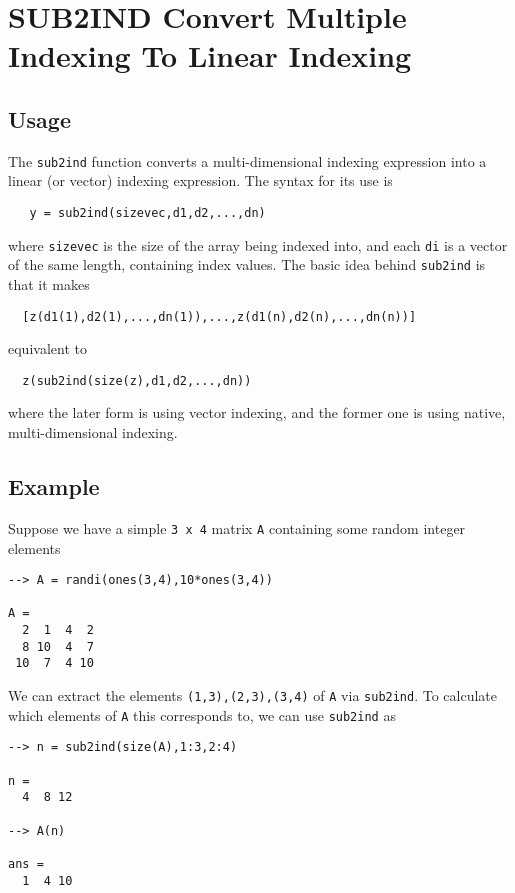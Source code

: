 \section{SUB2IND Convert Multiple Indexing To Linear Indexing}

\subsection{Usage}

The \verb|sub2ind| function converts a multi-dimensional indexing expression
into a linear (or vector) indexing expression.  The syntax for its use
is
\begin{verbatim}
   y = sub2ind(sizevec,d1,d2,...,dn)
\end{verbatim}
where \verb|sizevec| is the size of the array being indexed into, and each
\verb|di| is a vector of the same length, containing index values.  The basic
idea behind \verb|sub2ind| is that it makes
\begin{verbatim}
  [z(d1(1),d2(1),...,dn(1)),...,z(d1(n),d2(n),...,dn(n))]
\end{verbatim}
equivalent to
\begin{verbatim}
  z(sub2ind(size(z),d1,d2,...,dn))
\end{verbatim}
where the later form is using vector indexing, and the former one is using
native, multi-dimensional indexing.
\subsection{Example}

Suppose we have a simple \verb|3 x 4| matrix \verb|A| containing some random integer
elements
\begin{verbatim}
--> A = randi(ones(3,4),10*ones(3,4))

A = 
  2  1  4  2 
  8 10  4  7 
 10  7  4 10 
\end{verbatim}
We can extract the elements \verb|(1,3),(2,3),(3,4)| of \verb|A| via \verb|sub2ind|.
To calculate which elements of \verb|A| this corresponds to, we can use
\verb|sub2ind| as
\begin{verbatim}
--> n = sub2ind(size(A),1:3,2:4)

n = 
  4  8 12 

--> A(n)

ans = 
  1  4 10 
\end{verbatim}
